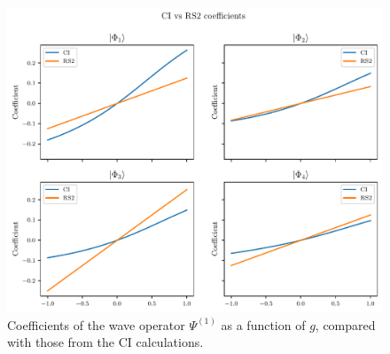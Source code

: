 \begin{figure}
    \centering
    \includegraphics[width=\textwidth]{figures/f_coefficients.pdf}
    \caption{
        Coefficients of the wave operator $\Psi^{(1)}$ as a function of $g$, compared with those from the CI calculations.\label{fig:f_coefficients}
    }
\end{figure}

